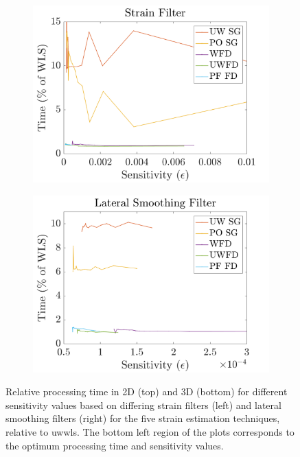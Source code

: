 \begin{figure}
\begin{subfigure}{0.49\textwidth}
		\includegraphics[width=\textwidth]{figures/sensitivity_3dtime_fr.png}
	\end{subfigure}
	\begin{subfigure}{0.49\textwidth}
		\centering
		\includegraphics[width=\textwidth]{figures/sensitivity_3dtime_lr.png}
	\end{subfigure}

	\caption{Relative processing time in 2D (top) and 3D (bottom) for different sensitivity values based on differing strain filters (left) and lateral smoothing filters (right) for the five strain estimation techniques, relative to \ac{uwwls}. The bottom left region of the plots corresponds to the optimum processing time and sensitivity values.}
	\label{sensitivity_time}
\end{figure}

